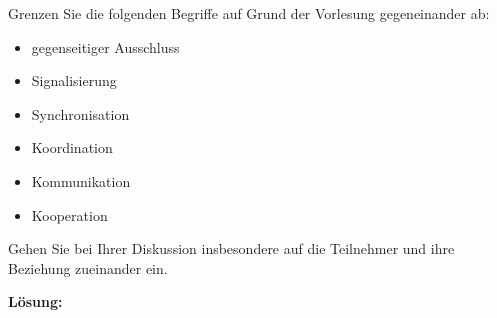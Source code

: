 

\begin{description}

Grenzen Sie die folgenden Begriffe auf Grund der Vorlesung gegeneinander ab: 
    \begin{itemize}
      \item gegenseitiger Ausschluss 
      \item Signalisierung 
      \item Synchronisation 
      \item Koordination 
      \item Kommunikation 
      \item Kooperation 
    \end{itemize}
Gehen Sie bei Ihrer Diskussion insbesondere auf die Teilnehmer und ihre Beziehung 
zueinander ein. 

\textbf{Lösung:}\\


\end{description}
